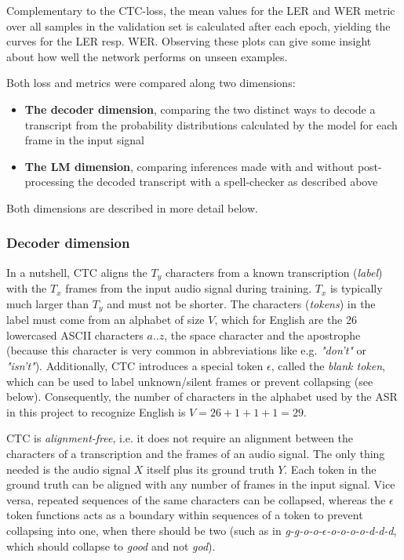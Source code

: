 Complementary to the \ac{CTC}-loss, the mean values for the \ac{LER} and \ac{WER} metric over all samples in the validation set is calculated after each epoch, yielding the curves for the \ac{LER} resp. \ac{WER}. Observing these plots can give some insight about how well the network performs on unseen examples.

Both loss and metrics were compared along two dimensions:

\begin{itemize}
	\item \textbf{The decoder dimension}, comparing the two distinct ways to decode a transcript from the probability distributions calculated by the model for each frame in the input signal
	\item \textbf{The LM dimension}, comparing inferences made with and without post-processing the decoded transcript with a spell-checker as described above
\end{itemize}

Both dimensions are described in more detail below.

\subsubsection{Decoder dimension}

In a nutshell, \ac{CTC} aligns the $T_y$ characters from a known transcription (\textit{label}) with the $T_x$ frames from the input audio signal during training. $T_x$ is typically much larger than $T_y$ and must not be shorter. The characters (\textit{tokens}) in the label must come from an alphabet of size $V$, which for English are the 26 lowercased ASCII characters $a..z$, the space character and the apostrophe (because this character is very common in abbreviations like e.g. \textit{"don't"} or \textit{"isn't"}). Additionally, \ac{CTC} introduces a special token $\epsilon$, called the \textit{blank token}, which can be used to label unknown/silent frames or prevent collapsing (see below). Consequently, the number of characters in the alphabet used by the \ac{ASR} in this project to recognize English is $V=26+1+1+1=29$.

\ac{CTC} is \textit{alignment-free}, i.e. it does not require an alignment between the characters of a transcription and the frames of an audio signal. The only thing needed is the audio signal $X$ itself plus its ground truth $Y$. Each token in the ground truth can be aligned with any number of frames in the input signal. Vice versa, repeated sequences of the same characters can be collapsed, whereas the $\epsilon$ token functions acts as a boundary within sequences of a token to prevent collapsing into one, when there should be two (such as in \textit{g-g-o-o-$\epsilon$-o-o-o-o-d-d-d}, which should collapse to \textit{good} and not \textit{god}). 

